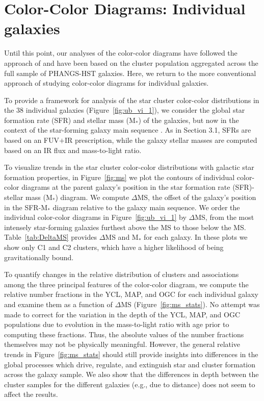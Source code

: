 \documentclass[]{aastex631}
\begin{document}
\section{Color-Color Diagrams: Individual galaxies}\label{ssect:cc_sf}

Until this point, our analyses of the color-color diagrams have followed the approach of \citet{lee23ubvi} and have been based on the cluster population aggregated across the full sample of PHANGS-HST galaxies.  Here, we return to the more conventional approach of studying color-color diagrams for individual galaxies.

To provide a framework for analysis of the star cluster color-color distributions in the 38 individual galaxies (Figure~\ref{fig:ub_vi_1}), we consider the global star formation rate (SFR) and stellar mass (M$_*$) of the galaxies, but now in the context of the star-forming galaxy main sequence \citep[e.g.,][]{salim_uv_2007, noeske_star_2007, lee_star_2007,peng_mass_2010}.  As in Section 3.1, SFRs are based on an FUV$+$IR prescription, while the galaxy stellar masses are computed based on an IR flux and mass-to-light ratio.

To visualize trends in the star cluster color-color distributions with galactic star formation properties, in  Figure~\ref{fig:ms} we plot the contours of individual color-color diagrams at the parent galaxy’s position in the star formation rate (SFR)-stellar mass (M$_*$) diagram.  We compute $\Delta$MS, the offset of the galaxy's position in the SFR-M$_*$ diagram relative to the galaxy main sequence.   We order the individual color-color diagrams in Figure~\ref{fig:ub_vi_1} by $\Delta$MS, from the most intensely star-forming galaxies furthest above the MS to those below the MS.  Table~\ref{tab:DeltaMS} provides $\Delta$MS and M$_*$ for each galaxy.  In these plots we show only C1 and C2 clusters, which have a higher likelihood of being gravitationally bound.  

To quantify changes in the relative distribution of clusters and associations among the three principal features of the color-color diagram, we compute the relative number fractions in the YCL, MAP, and OGC for each individual galaxy and examine them as a function of $\Delta$MS (Figure~\ref{fig:ms_stats}). No attempt was made to correct for the variation in the depth of the YCL, MAP, and OGC populations due to evolution in the mass-to-light ratio with age prior to computing these fractions.  Thus, the absolute values of the number fractions themselves may not be physically meaningful.  However, the general 
relative trends in Figure~\ref{fig:ms_stats} should still provide insights into differences in the global processes which drive, regulate, and extinguish star and cluster formation across the galaxy sample.  We also show that the differences in depth between the cluster samples for the different galaxies (e.g., due to distance) does not seem to affect the results.
\end{document}
